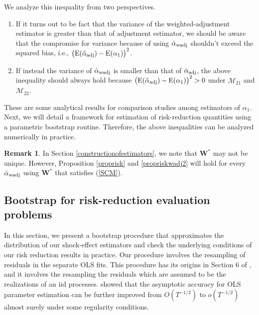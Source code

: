 \documentclass[11pt]{article}
\def\mrm#1{\mathrm{#1}} %
\def\mc#1{\mathcal{#1}} %
\def\E#1{\mathrm{E}(#1)} %
\theoremstyle{definition}
\newtheorem{remark}{Remark}
\begin{document}
We analyze this inequality from two perspectives. 
 \begin{enumerate}
   \item If it turns out to be fact that the variance of the weighted-adjustment estimator is greater than that of adjustment estimator, we should be aware that  the compromise for variance because of using $\hat{\alpha}_{\rm wadj}$ shouldn't exceed the squared bias, i.e., $\big(\E{\hat{\alpha}_{\rm adj}}-\mrm{E}(\alpha_1)\big)^2$.
   \item If instead the variance of $\hat{\alpha}_{\rm wadj}$ is smaller than that of $\hat{\alpha}_{\rm adj}$, the above inequality should always hold because $\big(\E{\hat{\alpha}_{\rm adj}}-\mrm{E}(\alpha_1)\big)^2>0$ under $\mc{M}_{21}$ and $\mc{M}_{22}$. 
 \end{enumerate}
  
 These are some analytical results for comparison studies among estimators of $\alpha_1$. Next, we will detail a framework for estimation of risk-reduction  quantities using a parametric bootstrap routine. Therefore, the above inequalities can be analyzed numerically in practice.

\begin{remark}
  In Section \ref{constructionofestimators}, we note that $\mathbf{W}^*$ may not be unique. However, Proposition \ref{proprisk} and \ref{propriskwadj2} will hold for  every $\hat{\alpha}_{\rm wadj}$ using  $\mathbf{W}^*$ that satisfies (\ref{SCM}).
\end{remark}


\subsection{Bootstrap for risk-reduction evaluation problems}
\label{varbootstrap}


In this section, we present a bootstrap procedure 
that approximates the distribution of our shock-effect estimators and check the underlying conditions of our risk reduction results in practice. Our procedure involves the resampling of residuals in the separate OLS fits. This procedure has its origins in Section 6 of \citet{efron1986bootstrap}, and it involves the resampling the residuals which are assumed to be the realizations of an iid processes.
\citet{bose1988edgeworth} showed that the asymptotic accuracy for OLS parameter estimation can be further improved from $O(T^{-1/2})$ to $o(T^{-1/2})$ almost surely under some regularity conditions. 
\end{document}
